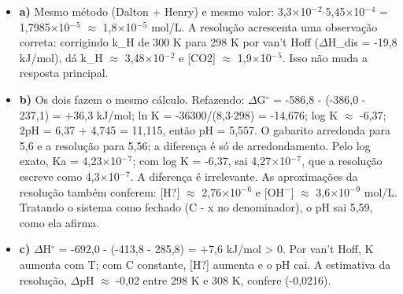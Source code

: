\documentclass{article}%
\begin{document}
\begin{itemize}%
\item%
\textbf{a)} Mesmo método (Dalton + Henry) e mesmo valor: 3,3$\times$10$^{-}$$^2$$\cdot$5,45$\times$10$^{-}$$^{4}$ = 1,7985$\times$10$^{-}$$^{5}$ $\approx$ 1,8$\times$10$^{-}$$^{5}$ mol/L. A resolução acrescenta uma observação correta: corrigindo k\_H de 300 K para 298 K por van't Hoff ($\Delta$H\_dis = -19,8 kJ/mol), dá k\_H $\approx$ 3,48$\times$10$^{-}$$^2$ e {[}CO2{]} $\approx$ 1,9$\times$10$^{-}$$^{5}$. Isso não muda a resposta principal.%
\item%
\textbf{b)} Os dois fazem o mesmo cálculo. Refazendo: $\Delta$G$^\circ$ = -586,8 - (-386,0 - 237,1) = +36,3 kJ/mol; ln K = -36300/(8,3$\cdot$298) = -14,676; log K $\approx$ -6,37; 2pH = 6,37 + 4,745 = 11,115, então pH = 5,557. O gabarito arredonda para 5,6 e a resolução para 5,56; a diferença é só de arredondamento. Pelo log exato, Ka = 4,23$\times$10$^{-}$$^{7}$; com log K = -6,37, sai 4,27$\times$10$^{-}$$^{7}$, que a resolução escreve como 4,3$\times$10$^{-}$$^{7}$. A diferença é irrelevante. As aproximações da resolução também conferem: {[}H?{]} $\approx$ 2,76$\times$10$^{-}$$^{6}$ e {[}OH$^{-}${]} $\approx$ 3,6$\times$10$^{-}$$^{9}$ mol/L. Tratando o sistema como fechado (C - x no denominador), o pH sai 5,59, como ela afirma.%
\item%
\textbf{c)} $\Delta$H$^\circ$ = -692,0 - (-413,8 - 285,8) = +7,6 kJ/mol > 0. Por van't Hoff, K aumenta com T; com C constante, {[}H?{]} aumenta e o pH cai. A estimativa da resolução, $\Delta$pH $\approx$ -0,02 entre 298 K e 308 K, confere (-0,0216).%
\end{itemize}%
\end{document}
